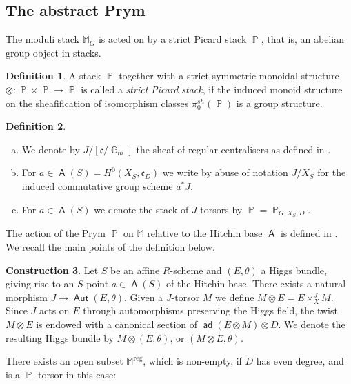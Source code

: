 \documentclass{article}
\DeclareMathOperator{\reg}{reg}
\DeclareMathOperator{\A}{\mathsf{A}}
\DeclareMathOperator{\Pb}{\mathbb{P}}
\DeclareMathOperator{\Aut}{\mathsf{Aut}}
\DeclareMathOperator{\G}{\mathbb{G}}
\DeclareMathOperator{\ad}{\mathsf{ad}}
\theoremstyle{definition}
\newtheorem{definition}{Definition}[section]
\newtheorem{construction}[definition]{Construction}
\theoremstyle{plain}
\begin{document}
\subsection{The abstract Prym}\label{sub:prym}

The moduli stack $\mathbb{M}_G$ is acted on by a strict Picard stack $\Pb$, that is, an abelian group object in stacks. 

\begin{definition}
A stack $\Pb$ together with a strict symmetric monoidal structure $\otimes \colon \Pb \times \Pb \to \Pb$ is called a \emph{strict Picard stack}, if the induced monoid structure on the sheafification of isomorphism classes
$\pi_0^{sh}(\Pb)$ is a group structure.
\end{definition}

\begin{definition}
\begin{enumerate}[(a)]
\item We denote by $J/[\mathfrak{c}/\G_m]$ the sheaf of regular centralisers as defined in \cite[2.1]{MR2653248}.
\item For $a\in \A(S)=H^0(X_S,\mathfrak{c}_D)$ we write by abuse of notation $J/X_S$ for the induced commutative group scheme $a^* J$.
\item For $a\in \A(S)$ we denote the stack of $J$-torsors by $\Pb=\Pb_{G,X_S,D}$.
\end{enumerate}
\end{definition}

The action of the Prym $\Pb$ on $\mathbb{M}$ relative to the Hitchin base $\A$ is defined in \cite[4.3.2]{MR2653248}. We recall the main points of the definition below.

\begin{construction}\label{const:action}
Let $S$ be an affine $R$-scheme and $(E,\theta)$ a Higgs bundle, giving rise to an $S$-point $a \in \A(S)$ of the Hitchin base. There exists a natural morphism $J \to \Aut(E,\theta)$. Given a $J$-torsor $M$ we define $M \otimes E = E \times_X^{J} M$. Since $J$ acts on $E$ through automorphisms preserving the Higgs field, the twist $M \otimes E$ is endowed with a canonical section of $\ad(E \otimes M) \otimes D$. We denote the resulting Higgs bundle by $M \otimes (E,\theta)$, or $(M \otimes E,\theta)$.
\end{construction}

There exists an open subset $\mathbb{M}^{\reg}$, which is non-empty, if $D$ has even degree, and is a $\Pb$-torsor in this case:
\end{document}

